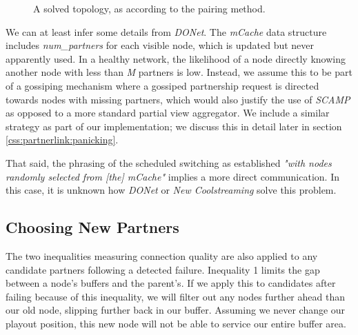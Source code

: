 \documentclass[12pt,a4paper]{article}
\begin{document}
\begin{figure}[!ht]
	\centering
	\caption{A solved topology, as according to the pairing method.}
	\label{fig2}
\end{figure}

We can at least infer some details from \textit{DONet}. The \textit{mCache} data structure includes \textit{num\_partners} for each visible node, which is updated but never apparently used. In a healthy network, the likelihood of a node directly knowing another node with less than \textit{M} partners is low. Instead, we assume this to be part of a gossiping mechanism where a gossiped partnership request is directed towards nodes with missing partners, which would also justify the use of \textit{SCAMP} as opposed to a more standard partial view aggregator. We include a similar strategy as part of our implementation; we discuss this in detail later in section \ref{css:partnerlink:panicking}.

That said, the phrasing of the scheduled switching as established \textit{"with nodes randomly selected from [the] mCache"} implies a more direct communication. In this case, it is unknown how \textit{DONet} or \textit{New Coolstreaming} solve this problem.

\subsection{Choosing New Partners} \label{problems:newpartners}
The two inequalities measuring connection quality are also applied to any candidate partners following a detected failure. Inequality 1 limits the gap between a node's  buffers and the parent's. If we apply this to candidates after failing because of this inequality, we will filter out any nodes further ahead than our old node, slipping further back in our buffer. Assuming we never change our playout position, this new node will not be able to service our entire buffer area.
\end{document}
